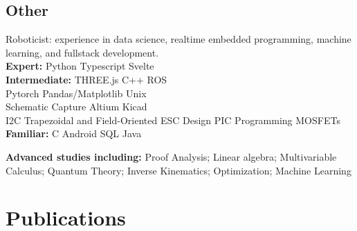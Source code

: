 \documentclass[]{deedy-resume-openfont}
\begin{document}
\begin{paracol}{2}
\subsection{Other}
Roboticist: experience in data science,  realtime embedded programming, machine learning, and fullstack development. \\
\textbf{Expert:} Python \textbullet{} Typescript  \textbullet{}
 Svelte \\
\textbf{Intermediate:} THREE.js \textbullet{} C++ \textbullet{} ROS \\ 
Pytorch \textbullet{} Pandas/Matplotlib \textbullet{} Unix \\
Schematic Capture \textbullet{} Altium \textbullet{} Kicad  \\
I2C \textbullet{}  Trapezoidal and Field-Oriented ESC Design \textbullet{} PIC Programming \textbullet{} MOSFETs
\textbf{Familiar:}
C \textbullet{} Android \textbullet{} SQL \textbullet{} Java
%

\textbf{Advanced studies including:} Proof Analysis; Linear algebra; Multivariable Calculus; Quantum Theory; Inverse Kinematics; Optimization; Machine Learning
\sectionsep


\vspace{-1em}
\section{Publications} 
\nocite{*}
%
\printbibliography[heading=none]
\sectionsep



\end{paracol}
\end{document}
